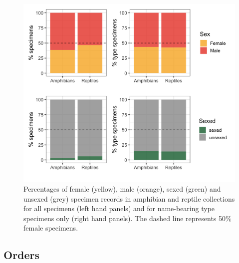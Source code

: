 \documentclass[a4paper, 12pt]{article}
\begin{document}
\begin{figure}[H]
 \centering
  \includegraphics[width = \linewidth]{figures/types-class.png}
  \caption{Percentages of female (yellow), male (orange), sexed (green) and unsexed (grey) specimen records in amphibian and reptile collections for all specimens (left hand panels) and for name-bearing type specimens only (right hand panels). 
  The dashed line represents 50\% female specimens.}
  \label{fig-types-class}
\end{figure}

\newpage
\subsection{Orders}
\end{document}
